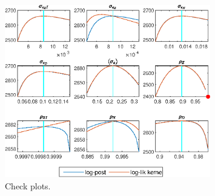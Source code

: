  
\begin{figure}[H]
\centering 
\includegraphics[width=0.80\textwidth]{BRS_extended_fd/graphs/BRS_extended_fd_CheckPlots1}
\caption{Check plots.}\label{Fig:CheckPlots:1}
\end{figure}
 
